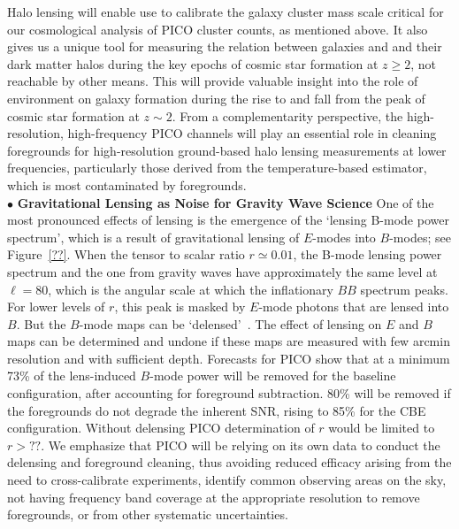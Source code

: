 \documentclass[PICOReport.tex]{subfiles}
\begin{document}
Halo lensing will enable use to calibrate the galaxy cluster mass scale critical for our cosmological analysis of PICO cluster counts, as mentioned above.  It also gives us a unique tool for measuring the relation between galaxies and and their dark matter halos during the key epochs of cosmic star formation at $z\geq 2$, not reachable by other means.  This will provide valuable insight into the role of environment on galaxy formation during the rise to and fall from the peak of cosmic star formation at $z\sim 2$.  From a complementarity perspective, the high-resolution, high-frequency PICO channels will play an essential role in cleaning foregrounds for high-resolution ground-based halo lensing measurements at lower frequencies, particularly those derived from the temperature-based estimator, which is most contaminated by foregrounds. \\
%
$\bullet$ {\bf Gravitational Lensing as Noise for Gravity Wave Science} \hspace{0.1in} \label{lensingnoise}
 One of the most pronounced effects of lensing is the emergence of the `lensing B-mode power spectrum', which is a result of gravitational lensing of $E$-modes into $B$-modes;  see Figure~\ref{??}.   When the tensor to scalar ratio $r \simeq 0.01$, the B-mode lensing power spectrum and the one from gravity waves have approximately the same level at $\ell = 80$, which is the angular scale at which the inflationary $BB$ spectrum peaks. For lower levels of $r$, this peak is masked by $E$-mode photons that are lensed into $B$. But the $B$-mode maps can be `delensed'~\citep{2004PhRvD..69d3005S,2012JCAP...06..014S}. The effect of lensing on $E$ and $B$ maps can be determined and undone if these maps are measured with few arcmin resolution and with sufficient depth. Forecasts for PICO show that at a minimum 73\% of the lens-induced $B$-mode power will be removed for the baseline configuration, after accounting for foreground subtraction. 80\% will be removed if the foregrounds do not degrade the inherent \ac{SNR}, rising to 85\% for the CBE configuration. Without delensing PICO determination of $r$ would be limited to $r>??$. We emphasize that PICO will be relying on its own data to conduct the delensing and foreground cleaning, thus avoiding reduced efficacy arising from the need to cross-calibrate experiments, identify common observing areas on the sky, not having frequency band coverage at the appropriate resolution to remove foregrounds, or from other systematic uncertainties.  \\
\end{document}
